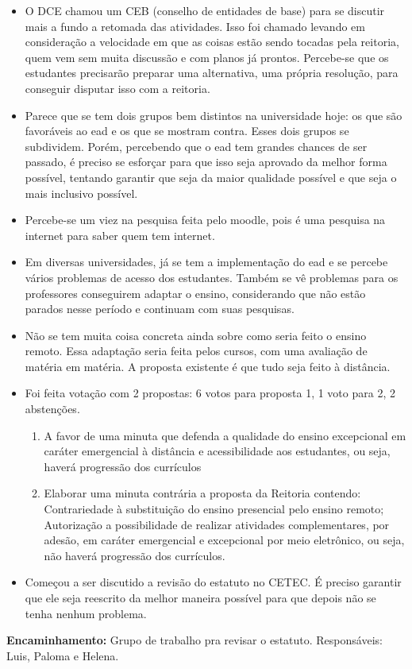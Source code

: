 \documentclass{ata-calico}
\begin{document}
\begin{itemize}
\item O DCE chamou um CEB (conselho de entidades de base) para se discutir mais a fundo a retomada das atividades. Isso foi chamado levando em consideração a velocidade em que as coisas estão sendo tocadas pela reitoria, quem vem sem muita discussão e com planos já prontos. Percebe-se que os estudantes precisarão preparar uma alternativa, uma própria resolução, para conseguir disputar isso com a reitoria.
\item Parece que se tem dois grupos bem distintos na universidade hoje: os que são favoráveis ao ead e os que se mostram contra. Esses dois grupos se subdividem. Porém, percebendo que o ead tem grandes chances de ser passado, é preciso se esforçar para que isso seja aprovado da melhor forma possível, tentando garantir que seja da maior qualidade possível e que seja o mais inclusivo possível.
\item Percebe-se um viez na pesquisa feita pelo moodle, pois é uma pesquisa na internet para saber quem tem internet.
\item Em diversas universidades, já se tem a implementação do ead e se percebe vários problemas de acesso dos estudantes. Também se vê problemas para os professores conseguirem adaptar o ensino, considerando que não estão parados nesse período e continuam com suas pesquisas.
\item Não se tem muita coisa concreta ainda sobre como seria feito o ensino remoto. Essa adaptação seria feita pelos cursos, com uma avaliação de matéria em matéria. A proposta existente é que tudo seja feito à distância.
\item Foi feita votação com 2 propostas: 6 votos para proposta 1, 1 voto para 2, 2 abstenções.
\begin{enumerate}
    \item A favor de uma minuta que defenda a qualidade do ensino excepcional em caráter emergencial à distância e acessibilidade aos estudantes, ou seja, haverá progressão dos currículos
    \item Elaborar uma minuta contrária a proposta da Reitoria contendo: Contrariedade à substituição do ensino presencial pelo ensino remoto; Autorização a possibilidade de realizar atividades complementares, por adesão, em caráter emergencial e excepcional por meio eletrônico, ou seja, não haverá progressão dos currículos.
\end{enumerate}
\end{itemize}

\begin{itemize}
\item Começou a ser discutido a revisão do estatuto no CETEC. É preciso garantir que ele seja reescrito da melhor maneira possível para que depois não se tenha nenhum problema.
\end{itemize}

\textbf{Encaminhamento:} Grupo de trabalho pra revisar o estatuto. Responsáveis: Luis, Paloma e Helena.

\end{document}
